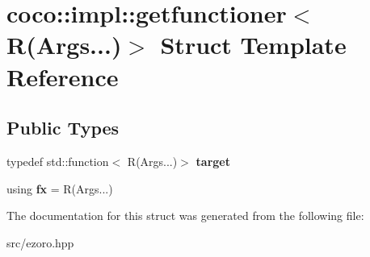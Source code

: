 \hypertarget{structcoco_1_1impl_1_1getfunctioner_3_01_r_07_args_8_8_8_08_4}{\section{coco\-:\-:impl\-:\-:getfunctioner$<$ R(Args...)$>$ Struct Template Reference}
\label{structcoco_1_1impl_1_1getfunctioner_3_01_r_07_args_8_8_8_08_4}
}
\subsection*{Public Types}
\begin{DoxyCompactItemize}
\item 
\hypertarget{structcoco_1_1impl_1_1getfunctioner_3_01_r_07_args_8_8_8_08_4_a7572e5f95c6cb289a8ff1ebbd5aaa8a7}{typedef std\-::function$<$ R(Args...)$>$ {\bfseries target}}\label{structcoco_1_1impl_1_1getfunctioner_3_01_r_07_args_8_8_8_08_4_a7572e5f95c6cb289a8ff1ebbd5aaa8a7}

\item 
\hypertarget{structcoco_1_1impl_1_1getfunctioner_3_01_r_07_args_8_8_8_08_4_af21388293087ebe0cdffbee090673e81}{using {\bfseries fx} = R(Args...)}\label{structcoco_1_1impl_1_1getfunctioner_3_01_r_07_args_8_8_8_08_4_af21388293087ebe0cdffbee090673e81}

\end{DoxyCompactItemize}


The documentation for this struct was generated from the following file\-:\begin{DoxyCompactItemize}
\item 
src/ezoro.\-hpp\end{DoxyCompactItemize}
